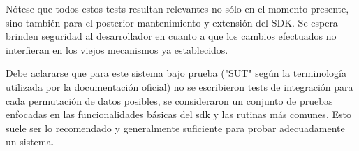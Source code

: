 N\'otese que todos estos tests resultan relevantes no s\'olo en el momento presente, sino tambi\'en para el posterior mantenimiento y extensi\'on del SDK. Se espera brinden seguridad al desarrollador en cuanto a que los cambios efectuados no interfieran en los viejos mecanismos ya establecidos.






Debe aclararse que para este sistema bajo prueba ("SUT" seg\'un la terminolog\'ia utilizada por la documentaci\'on oficial) no se escribieron tests de integración para cada permutación de datos posibles, se consideraron un conjunto de pruebas enfocadas en las funcionalidades b\'asicas del sdk y las rutinas m\'as comunes. Esto suele ser lo recomendado y generalmente suficiente para probar adecuadamente un sistema. 



